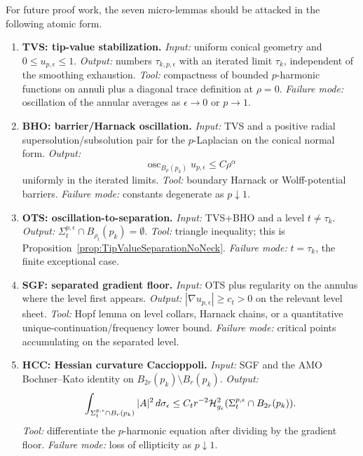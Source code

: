 \begin{remark}
\label{rem:TipNeckAtomicLedger}
For future proof work, the seven micro-lemmas should be attacked in the
following atomic form.
\begin{enumerate}
    \item \textbf{TVS: tip-value stabilization.}
    \emph{Input:} uniform conical geometry and \(0\le u_{p,\epsilon}\le1\).
    \emph{Output:} numbers \(\tau_{k,p,\epsilon}\) with an iterated limit
    \(\tau_k\), independent of the smoothing exhaustion.
    \emph{Tool:} compactness of bounded \(p\)-harmonic functions on annuli plus
    a diagonal trace definition at \(\rho=0\).
    \emph{Failure mode:} oscillation of the annular averages as
    \(\epsilon\to0\) or \(p\to1\).

    \item \textbf{BHO: barrier/Harnack oscillation.}
    \emph{Input:} TVS and a positive radial supersolution/subsolution pair for
    the \(p\)-Laplacian on the conical normal form.
    \emph{Output:}
    \[
        \operatorname{osc}_{B_\rho(p_k)}u_{p,\epsilon}
        \le C\rho^\alpha
    \]
    uniformly in the iterated limits.
    \emph{Tool:} boundary Harnack or Wolff-potential barriers.
    \emph{Failure mode:} constants degenerate as \(p\downarrow1\).

    \item \textbf{OTS: oscillation-to-separation.}
    \emph{Input:} TVS+BHO and a level \(t\ne\tau_k\).
    \emph{Output:} \(\Sigma_t^{p,\epsilon}\cap B_{\rho_t}(p_k)=\emptyset\).
    \emph{Tool:} triangle inequality; this is
    Proposition~\ref{prop:TipValueSeparationNoNeck}.
    \emph{Failure mode:} \(t=\tau_k\), the finite exceptional case.

    \item \textbf{SGF: separated gradient floor.}
    \emph{Input:} OTS plus regularity on the annulus where the level first
    appears.
    \emph{Output:} \(|\nabla u_{p,\epsilon}|\ge c_t>0\) on the relevant level
    sheet.
    \emph{Tool:} Hopf lemma on level collars, Harnack chains, or a quantitative
    unique-continuation/frequency lower bound.
    \emph{Failure mode:} critical points accumulating on the separated level.

    \item \textbf{HCC: Hessian curvature Caccioppoli.}
    \emph{Input:} SGF and the AMO Bochner--Kato identity on
    \(B_{2r}(p_k)\setminus B_r(p_k)\).
    \emph{Output:}
    \[
        \int_{\Sigma_t^{p,\epsilon}\cap B_r(p_k)}
        |A|^2\,d\sigma_\epsilon
        \le C_t r^{-2}
        \mathcal H^2_{g_{\epsilon}}
        (\Sigma_t^{p,\epsilon}\cap B_{2r}(p_k)).
    \]
    \emph{Tool:} differentiate the \(p\)-harmonic equation after dividing by
    the gradient floor.
    \emph{Failure mode:} loss of ellipticity as \(p\downarrow1\).


\end{enumerate}
\end{remark}
